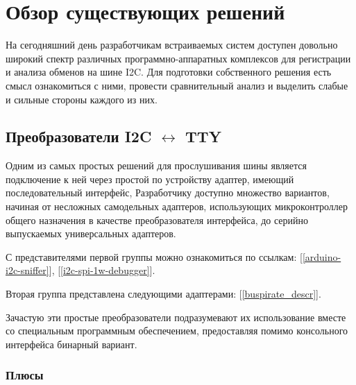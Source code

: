 \section{Обзор существующих решений}

На сегодняшний день разработчикам встраиваемых систем доступен довольно широкий спектр различных программно-аппаратных комплексов для регистрации и анализа обменов на шине I2C. Для подготовки собственного решения есть смысл ознакомиться с ними, провести сравнительный анализ и выделить слабые и сильные стороны каждого из них.

\subsection{Преобразователи I2C $\leftrightarrow$ TTY}

Одним из самых простых решений для прослушивания шины является подключение к ней через простой по устройству адаптер, имеющий последовательный интерфейс, Разработчику доступно множество вариантов, начиная от несложных самодельных адаптеров, использующих микроконтроллер общего назначения в качестве преобразователя интерфейса, до серийно выпускаемых универсальных адаптеров.

С представителями первой группы можно ознакомиться по ссылкам: [\ref{arduino-i2c-sniffer}], [\ref{i2c-spi-1w-debugger}].

Вторая группа представлена следующими адаптерами: [\ref{buspirate_descr}].

Зачастую эти простые преобразователи подразумевают их использование вместе со специальным программным обеспечением, предоставляя помимо консольного интерфейса бинарный вариант.

\subsubsection{Плюсы}

